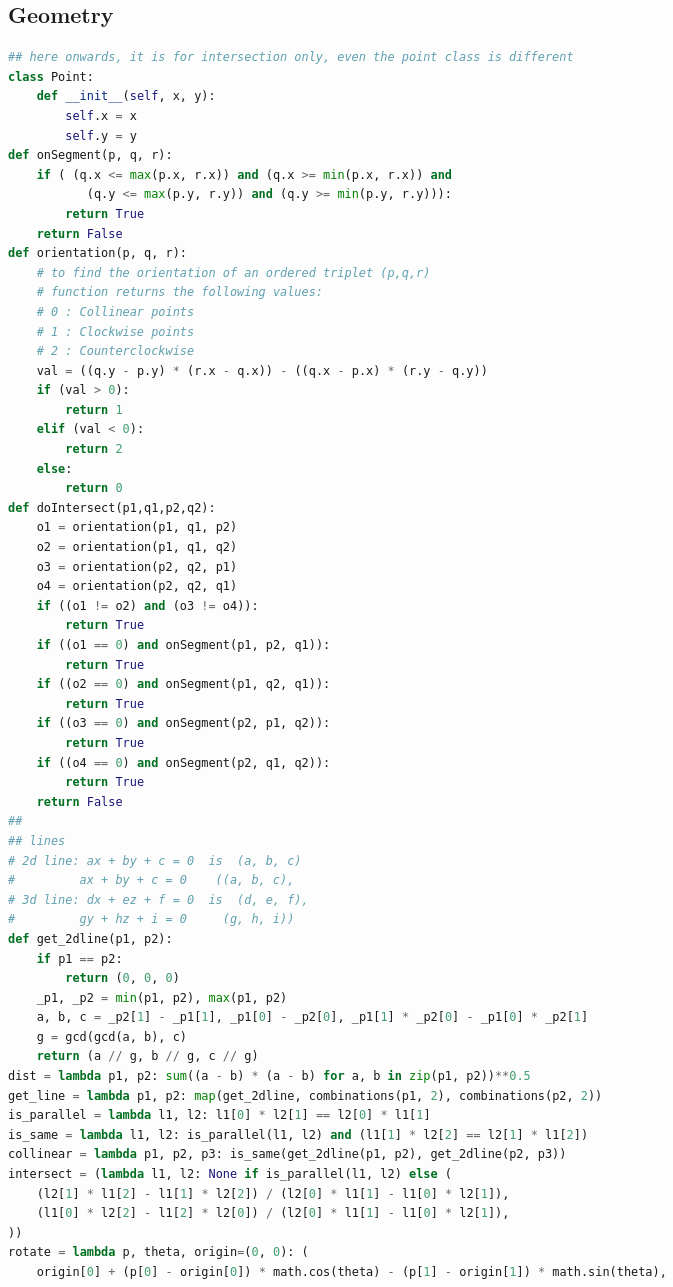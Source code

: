 \documentclass[10pt,landscape, a4paper]{article}
\begin{document}
\begin{multicols*}{3}
\section{Geometry}
\begin{lstlisting}[language=Python]
## here onwards, it is for intersection only, even the point class is different
class Point:
    def __init__(self, x, y):
        self.x = x
        self.y = y
def onSegment(p, q, r):
    if ( (q.x <= max(p.x, r.x)) and (q.x >= min(p.x, r.x)) and
           (q.y <= max(p.y, r.y)) and (q.y >= min(p.y, r.y))):
        return True
    return False
def orientation(p, q, r):
    # to find the orientation of an ordered triplet (p,q,r)
    # function returns the following values:
    # 0 : Collinear points
    # 1 : Clockwise points
    # 2 : Counterclockwise
    val = ((q.y - p.y) * (r.x - q.x)) - ((q.x - p.x) * (r.y - q.y))
    if (val > 0):
        return 1
    elif (val < 0):
        return 2
    else:
        return 0
def doIntersect(p1,q1,p2,q2):
    o1 = orientation(p1, q1, p2)
    o2 = orientation(p1, q1, q2)
    o3 = orientation(p2, q2, p1)
    o4 = orientation(p2, q2, q1)
    if ((o1 != o2) and (o3 != o4)):
        return True
    if ((o1 == 0) and onSegment(p1, p2, q1)):
        return True
    if ((o2 == 0) and onSegment(p1, q2, q1)):
        return True
    if ((o3 == 0) and onSegment(p2, p1, q2)):
        return True
    if ((o4 == 0) and onSegment(p2, q1, q2)):
        return True
    return False
##
## lines
# 2d line: ax + by + c = 0  is  (a, b, c)
#		  ax + by + c = 0	 ((a, b, c),
# 3d line: dx + ez + f = 0  is  (d, e, f),
#		  gy + hz + i = 0	  (g, h, i))
def get_2dline(p1, p2):
    if p1 == p2:
        return (0, 0, 0)
    _p1, _p2 = min(p1, p2), max(p1, p2)
    a, b, c = _p2[1] - _p1[1], _p1[0] - _p2[0], _p1[1] * _p2[0] - _p1[0] * _p2[1]
    g = gcd(gcd(a, b), c)
    return (a // g, b // g, c // g)
dist = lambda p1, p2: sum((a - b) * (a - b) for a, b in zip(p1, p2))**0.5
get_line = lambda p1, p2: map(get_2dline, combinations(p1, 2), combinations(p2, 2))
is_parallel = lambda l1, l2: l1[0] * l2[1] == l2[0] * l1[1]
is_same = lambda l1, l2: is_parallel(l1, l2) and (l1[1] * l2[2] == l2[1] * l1[2])
collinear = lambda p1, p2, p3: is_same(get_2dline(p1, p2), get_2dline(p2, p3))
intersect = (lambda l1, l2: None if is_parallel(l1, l2) else (
    (l2[1] * l1[2] - l1[1] * l2[2]) / (l2[0] * l1[1] - l1[0] * l2[1]),
    (l1[0] * l2[2] - l1[2] * l2[0]) / (l2[0] * l1[1] - l1[0] * l2[1]),
))
rotate = lambda p, theta, origin=(0, 0): (
    origin[0] + (p[0] - origin[0]) * math.cos(theta) - (p[1] - origin[1]) * math.sin(theta),

\end{lstlisting}
\end{multicols*}
\end{document}
